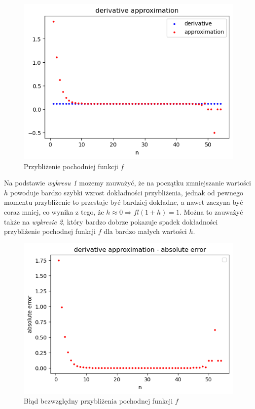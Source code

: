 \documentclass[12pt]{article}
\begin{document}
        \begin{figure}[h]
            \centering
            \includegraphics[width=0.8\linewidth]{ex7_deriv_approx.png}
            \caption{Przybliżenie pochodniej funkcji $f$}
            \label{fig:deriv_approx}
        \end{figure}

        \newpage
        \noindent
        Na podstawie \textit{wykresu 1} mozemy zauważyć, że na początku zmniejszanie wartości $h$
        powoduje bardzo szybki wzrost dokładności przybliżenia, jednak od pewnego momentu przybliżenie
        to przestaje być bardziej dokładne, a nawet zaczyna być coraz mniej, co wynika z tego, że $h \approx 0 \Rightarrow fl(1 + h) = 1$.
        \newline
        Można to zauważyć także na \textit{wykresie 2}, który bardzo dobrze pokazuje spadek dokładności
        przybliżenie pochodnej funkcji $f$ dla bardzo małych wartości $h$.
        \newline\newline\newline

        \begin{figure}[h]
            \centering
            \includegraphics[width=0.8\linewidth]{ex7_deriv_error.png}
            \caption{Błąd bezwzględny przybliżenia pochodnej funkcji $f$}
            \label{fig:deriv_error}
        \end{figure}
\end{document}
